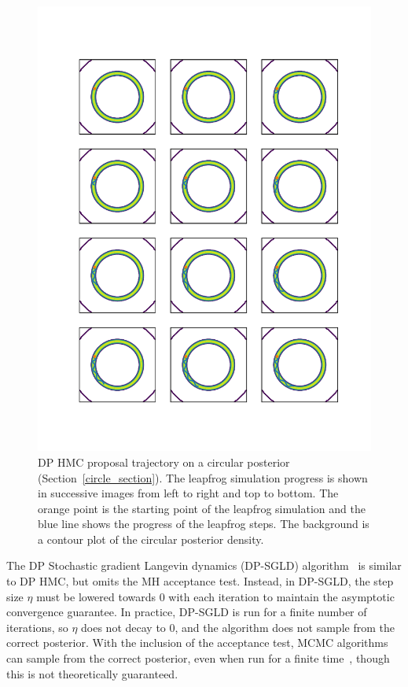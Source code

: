 \documentclass[english,twoside,openright]{HYgraduMLDS}
\begin{document}
\begin{figure}[h]
	\centering
  \includegraphics[width=\textwidth]{figures/hmc_trajectory}
  \caption{
    DP HMC proposal trajectory on a circular posterior
    (Section~\ref{circle_section}). The leapfrog simulation progress is shown
    in successive images from left to right and top to bottom.
    The orange point is the starting
    point of the leapfrog simulation and the blue line shows the progress
    of the leapfrog steps. The background is a contour plot of the circular
    posterior density.
  }
  \label{hmc_trajectory_fig}
\end{figure}

The DP Stochastic gradient Langevin dynamics (DP-SGLD) algorithm~\cite{WFS15}
is similar to DP HMC, but omits the MH acceptance test. Instead, in DP-SGLD,
the step size \(\eta\) must be lowered towards 0 with each iteration to maintain
the asymptotic convergence guarantee. In practice, DP-SGLD is run for a finite
number of iterations, so \(\eta\) does not decay to 0, and the algorithm
does not sample from the correct posterior. With the inclusion of the
acceptance test, MCMC algorithms can sample from the correct posterior, even
when run for a finite time~\cite{BDA}, though this is not theoretically guaranteed.
\end{document}
